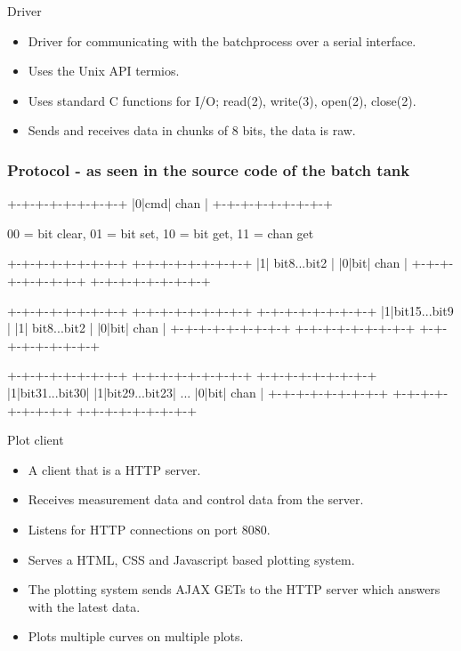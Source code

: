\documentclass{beamer}
\begin{document}
\begin{frame}{Driver}
        \begin{itemize}
            \item Driver for communicating with the batchprocess over a serial interface.
            \item Uses the Unix API termios.
            \item Uses standard C functions for I/O; read(2), write(3), open(2), close(2).
            \item Sends and receives data in chunks of 8 bits, the data is raw.   
        \end{itemize}
\end{frame}

\begin{frame}[fragile]
    \frametitle{Protocol - as seen in the source code of the batch tank}
        \small
\begin{semiverbatim}
+-+-+-+-+-+-+-+-+
|0|cmd|  chan   | 
+-+-+-+-+-+-+-+-+

00 = bit clear, 01 = bit set, 10 = bit get, 11 = chan get

+-+-+-+-+-+-+-+-+  +-+-+-+-+-+-+-+-+ 
|1| bit8...bit2 |  |0|bit|  chan   |
+-+-+-+-+-+-+-+-+  +-+-+-+-+-+-+-+-+ 

+-+-+-+-+-+-+-+-+  +-+-+-+-+-+-+-+-+  +-+-+-+-+-+-+-+-+ 
|1|bit15...bit9 |  |1| bit8...bit2 |  |0|bit|  chan   |
+-+-+-+-+-+-+-+-+  +-+-+-+-+-+-+-+-+  +-+-+-+-+-+-+-+-+ 
 
+-+-+-+-+-+-+-+-+  +-+-+-+-+-+-+-+-+     +-+-+-+-+-+-+-+-+ 
|1|bit31...bit30|  |1|bit29...bit23| ... |0|bit|  chan   |
+-+-+-+-+-+-+-+-+  +-+-+-+-+-+-+-+-+     +-+-+-+-+-+-+-+-+ 
\end{semiverbatim}
\end{frame}

\begin{frame}{Plot client}
	\begin{itemize}
    		\item A client that is a HTTP server.
        \item Receives measurement data and control data from the server.
        \item Listens for HTTP connections on port 8080.
        \item Serves a HTML, CSS and Javascript based plotting system.
        \item The plotting system sends AJAX GETs to the HTTP server which answers with the latest data.
        \item Plots multiple curves on multiple plots.
    \end{itemize}
\end{frame}
\end{document}
